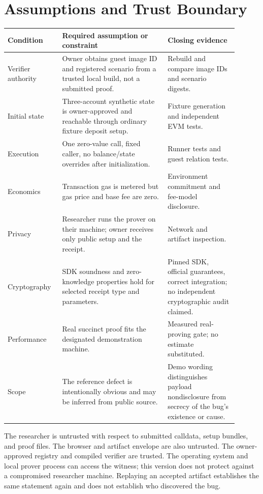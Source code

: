 \documentclass[11pt]{article}
\begin{document}
\section{Assumptions and Trust Boundary}
\begin{longtable}{L{0.20\linewidth}L{0.42\linewidth}L{0.28\linewidth}}
\toprule
\textbf{Condition} & \textbf{Required assumption or constraint} & \textbf{Closing evidence} \\
\midrule
\endhead
Verifier authority & Owner obtains guest image ID and registered scenario from a trusted local build, not a submitted proof. & Rebuild and compare image IDs and scenario digests. \\
Initial state & Three-account synthetic state is owner-approved and reachable through ordinary fixture deposit setup. & Fixture generation and independent EVM tests. \\
Execution & One zero-value call, fixed caller, no balance/state overrides after initialization. & Runner tests and guest relation tests. \\
Economics & Transaction gas is metered but gas price and base fee are zero. & Environment commitment and fee-model disclosure. \\
Privacy & Researcher runs the prover on their machine; owner receives only public setup and the receipt. & Network and artifact inspection. \\
Cryptography & SDK soundness and zero-knowledge properties hold for selected receipt type and parameters. & Pinned SDK, official guarantees, correct integration; no independent cryptographic audit claimed. \\
Performance & Real succinct proof fits the designated demonstration machine. & Measured real-proving gate; no estimate substituted. \\
Scope & The reference defect is intentionally obvious and may be inferred from public source. & Demo wording distinguishes payload nondisclosure from secrecy of the bug's existence or cause. \\
\bottomrule
\end{longtable}

The researcher is untrusted with respect to submitted calldata, setup bundles, and proof files. The browser and artifact envelope are also untrusted. The owner-approved registry and compiled verifier are trusted. The operating system and local prover process can access the witness; this version does not protect against a compromised researcher machine. Replaying an accepted artifact establishes the same statement again and does not establish who discovered the bug.
\end{document}
